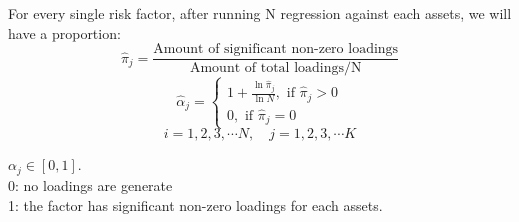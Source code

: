 \documentclass[12pt]{beamer}
\begin{document}
\begin{frame}
	For every single risk factor, after running N regression against each assets, we will have a proportion:\\
		\[ \hat{\pi}_j = \frac{\text{Amount of significant non-zero loadings}}{\text{Amount of total loadings/N} }  \]
		\newline
\[\hat{\alpha}_{j}=\left\{\begin{array}{l}
	1+\frac{\ln \hat{\pi}_{ j}}{\ln N}, \text { if } \hat{\pi}_{ j}>0 \\
	0, \text { if } \hat{\pi}_{j} = 0
\end{array}\]
\[ i = 1,2,3,\cdots N,\quad j = 1,2,3, \cdots K\]

$\alpha_j \in [0,1]$.\\
0: no loadings are generate\\
1: the factor has significant non-zero loadings for each assets.
\end{frame}
\end{document}
